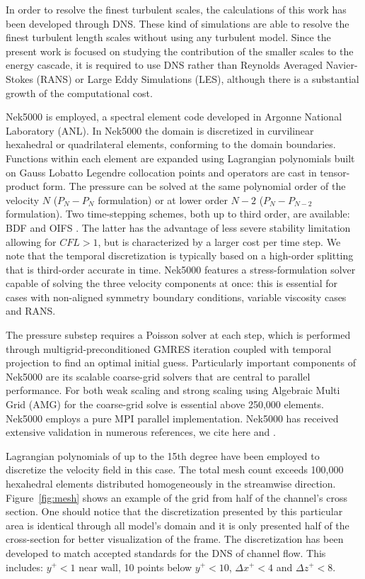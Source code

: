 \documentclass[twocolumn,10pt]{asme2e}
\begin{document}
In order to resolve the finest turbulent scales, the calculations of this work has been developed through DNS.
These kind of simulations are able to resolve the finest turbulent length scales without using any turbulent model. Since the present work is focused on studying the contribution of the smaller scales to the energy cascade, it is required to use DNS rather than Reynolds Averaged Navier-Stokes (RANS) or Large Eddy Simulations (LES), although there is a substantial growth of the computational cost.

Nek5000 is employed, a spectral element code developed in Argonne National Laboratory (ANL).  In Nek5000 \cite{fischer2015nek5000} \cite{fischer1997} the domain is discretized in curvilinear hexahedral  or quadrilateral elements, conforming to the domain boundaries. Functions within each element are expanded using Lagrangian polynomials built on Gauss Lobatto Legendre collocation points and operators are cast in tensor-product form. The pressure can be solved at the same polynomial order of the velocity $N$ ($P_{N}-P_{N}$ formulation) or at lower order $N-2$ ($P_{N}-P_{N-2}$ formulation). Two time-stepping schemes, both up to third order, are available: BDF and OIFS \cite{fischer2003implementation}. The latter has the advantage of less severe stability limitation allowing for $CFL>1$, but is characterized by a larger cost per time step. We note that the temporal discretization is typically based on a high-order splitting that is third-order accurate in time.
Nek5000 features a stress-formulation solver capable of solving the three velocity components at once: this is essential for cases with non-aligned symmetry boundary conditions, variable viscosity cases and RANS.

The pressure substep requires a Poisson solver at each step, which is performed through multigrid-preconditioned GMRES iteration coupled with temporal projection to find an optimal initial guess. Particularly important components of Nek5000 are its scalable coarse-grid solvers that are central to parallel performance. For both weak scaling and strong scaling using Algebraic Multi Grid (AMG) for the coarse-grid solve is essential above 250,000 elements. Nek5000 employs a pure MPI parallel implementation. Nek5000 has received extensive validation in numerous references, we cite here \cite{merzari2013} and \cite{Obabko2011}.

Lagrangian polynomials of up to the 15th degree have been employed to discretize the velocity field in this case. The total mesh count exceeds 100,000 hexahedral elements distributed homogeneously in the streamwise direction. Figure~\ref{fig:mesh} shows an example of the grid from half of the channel's cross section. One should notice that the discretization presented by this particular area is identical through all model's domain and it is only presented half of the cross-section for better visualization of the frame. The discretization has been developed  to match accepted standards for the DNS of channel flow. This includes: $y^{+}<1$ near wall, 10 points below $y^{+}<10$, $\Delta x^{+}<4$ and $\Delta z^{+}<8$.
\end{document}
